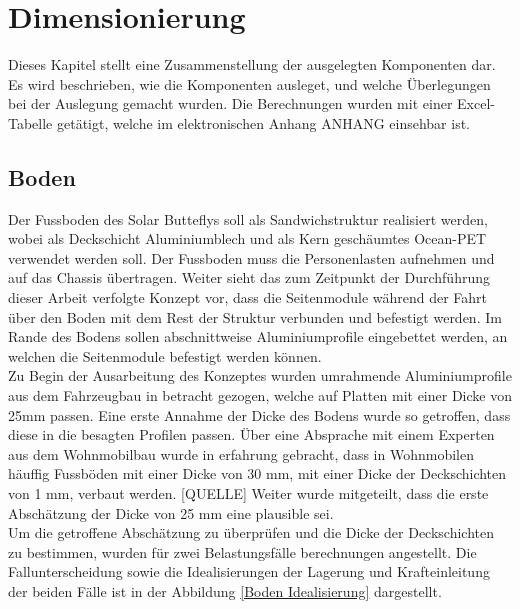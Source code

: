 \section{Dimensionierung}
Dieses Kapitel stellt eine Zusammenstellung der ausgelegten Komponenten dar. Es wird beschrieben, wie die Komponenten ausleget, und welche Überlegungen bei der Auslegung gemacht wurden. Die Berechnungen wurden mit einer Excel-Tabelle getätigt, welche im elektronischen Anhang ANHANG einsehbar ist.

\subsection{Boden}
Der Fussboden des Solar Butteflys soll als Sandwichstruktur realisiert werden, wobei als Deckschicht Aluminiumblech und als Kern geschäumtes Ocean-PET verwendet werden soll. Der Fussboden muss die Personenlasten aufnehmen und auf das Chassis übertragen. Weiter sieht das zum Zeitpunkt der Durchführung dieser Arbeit verfolgte Konzept vor, dass die Seitenmodule während der Fahrt über den Boden mit dem Rest der Struktur verbunden und befestigt werden. Im Rande des Bodens sollen abschnittweise Aluminiumprofile eingebettet werden, an welchen die Seitenmodule befestigt werden können.\\
Zu Begin der Ausarbeitung des Konzeptes wurden umrahmende Aluminiumprofile aus dem Fahrzeugbau in betracht gezogen, welche auf Platten mit einer Dicke von 25mm passen. Eine erste Annahme der Dicke des Bodens wurde so getroffen, dass diese in die besagten Profilen passen. Über eine Absprache mit einem Experten aus dem Wohnmobilbau wurde in erfahrung gebracht, dass in Wohnmobilen häuffig Fussböden mit einer Dicke von 30 mm, mit einer Dicke der Deckschichten von 1 mm, verbaut werden. [QUELLE] Weiter wurde mitgeteilt, dass die erste Abschätzung der Dicke von 25 mm eine plausible sei.\\

Um die getroffene Abschätzung zu überprüfen und die Dicke der Deckschichten zu bestimmen, wurden für zwei Belastungsfälle berechnungen angestellt. Die Fallunterscheidung sowie die Idealisierungen der Lagerung und Krafteinleitung der beiden Fälle ist in der Abbildung \ref{Boden Idealisierung} dargestellt.

